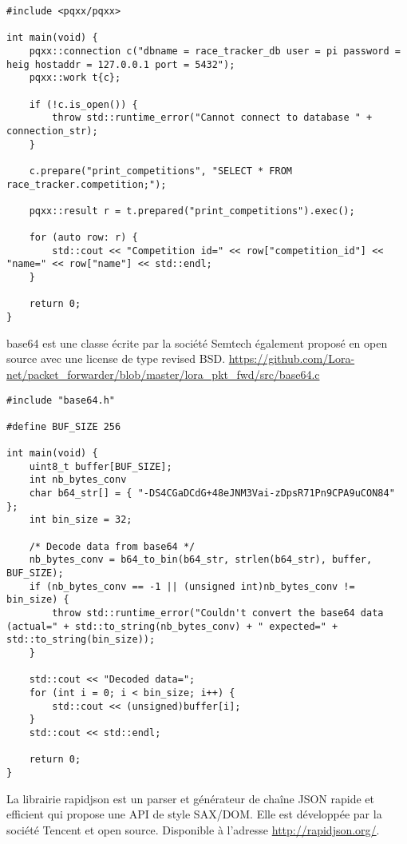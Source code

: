 \begin{lstlisting}[style=CStyle]
#include <pqxx/pqxx>

int main(void) {
	pqxx::connection c("dbname = race_tracker_db user = pi password = heig hostaddr = 127.0.0.1 port = 5432");
	pqxx::work t{c};

	if (!c.is_open()) {
		throw std::runtime_error("Cannot connect to database " + connection_str);
	}

	c.prepare("print_competitions", "SELECT * FROM race_tracker.competition;");

	pqxx::result r = t.prepared("print_competitions").exec();
	
	for (auto row: r) {
		std::cout << "Competition id=" << row["competition_id"] << "name=" << row["name"] << std::endl;
	}

	return 0;
}
\end{lstlisting}

base64 est une classe écrite par la société Semtech également proposé en open source avec une license de type revised BSD. \url{https://github.com/Lora-net/packet_forwarder/blob/master/lora_pkt_fwd/src/base64.c}

\begin{lstlisting}[style=CStyle]
#include "base64.h"

#define BUF_SIZE 256

int main(void) {
	uint8_t buffer[BUF_SIZE];
	int nb_bytes_conv
	char b64_str[] = { "-DS4CGaDCdG+48eJNM3Vai-zDpsR71Pn9CPA9uCON84" };
	int bin_size = 32;

	/* Decode data from base64 */
	nb_bytes_conv = b64_to_bin(b64_str, strlen(b64_str), buffer, BUF_SIZE);
	if (nb_bytes_conv == -1 || (unsigned int)nb_bytes_conv != bin_size) {
		throw std::runtime_error("Couldn't convert the base64 data (actual=" + std::to_string(nb_bytes_conv) + " expected=" + std::to_string(bin_size));
	}

	std::cout << "Decoded data=";
	for (int i = 0; i < bin_size; i++) {
		std::cout << (unsigned)buffer[i];
	}
	std::cout << std::endl;

	return 0;
}
\end{lstlisting}

La librairie rapidjson est un parser et générateur de chaîne JSON rapide et efficient qui propose une API de style SAX/DOM. Elle est développée par la société Tencent et open source. Disponible à l'adresse \url{http://rapidjson.org/}.

